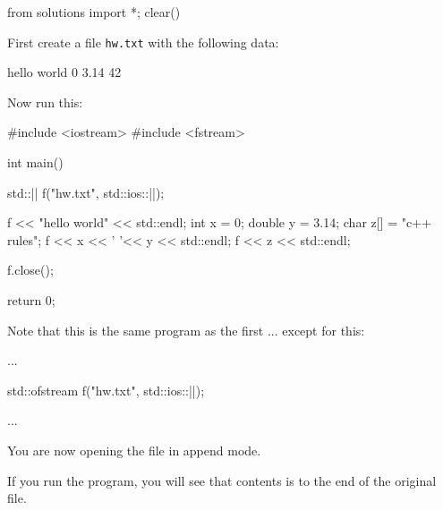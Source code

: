 \begin{python0}
from solutions import *; clear()
\end{python0}

First create a file \texttt{hw.txt} with the following data:

\begin{console}
hello world
0 3.14
42 
\end{console}

Now run this:

\begin{consolethree}[escapeinside=||]
#include <iostream>
#include <fstream>

int main()
{   
    std::|| f("hw.txt", std::ios::||);

    f << "hello world" << std::endl;
    int x = 0;
    double y = 3.14;
    char z[] = "c++ rules";
    f << x << ' '<< y << std::endl;
    f << z << std::endl;

    f.close();

    return 0;
}
\end{consolethree}

Note that this is the same program as the first ... except for this:

\begin{consolethree}[escapeinside=||]
...

std::ofstream f("hw.txt", std::ios::||);

... 
\end{consolethree}

You are now opening the file in append mode.

If you run the program, you will see that contents is  to the end of the original file.

